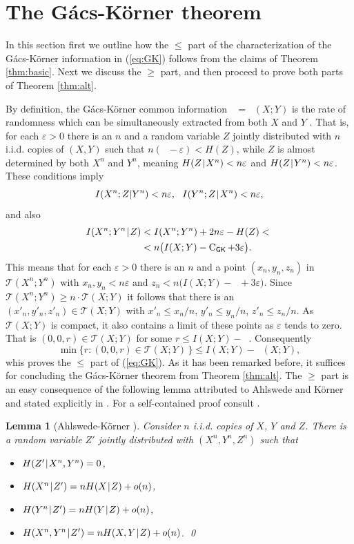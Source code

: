 \documentclass{IEEEtran}
\newtheorem{lemma}[theorem]{Lemma}
\newcommand\eps{\varepsilon}
\newcommand\T{\mathcal{T}}
\DeclareMathOperator\GK{C_{\mathsf{GK}}}
\newcommand\I{I\xspace}
\renewcommand\H{H\xspace}
\def\|{\mkern 1.4mu\mathord{|}\mkern 1.4mu}
\renewcommand{\ge}{\geqslant}
\renewcommand{\le}{\leqslant}
\begin{document}
\def\[{[\mskip -2mu[} \def\]{]\mskip -2mu]}
\def\cd{{\cdot}}

\section{The G\'acs-K\"orner theorem}\label{sec:MMRV}

In this section first we outline how the $\le$ part of the characterization
of the G\'acs-K\"orner information in (\ref{eq:GK}) follows from the claims
of Theorem \ref{thm:basic}. Next we discuss the $\ge$ part, and then proceed
to prove both parts of Theorem \ref{thm:alt}.

By definition, the G\'acs-K\"orner common information $\GK=\GK(X;Y)$ is the
rate of randomness which can be simultaneously extracted from both $X$ and
$Y$ \cite{gacs-korner}. That is, for each $\eps>0$ there is an $n$ and a random variable
$Z$ jointly distributed with $n$ {i.i.d.} copies of $(X,Y)$ such that
$n(\GK-\eps) < H(Z)$, while $Z$ is almost determined by both $X^n$ and
$Y^n$, meaning $\H(Z\|X^n)<n\eps$ and $\H(Z\|Y^n)<n\eps$. These conditions
imply
$$
   \I(X^n;Z|Y^n)<n\eps, ~~ \I(Y^n;Z\|X^n)<n\eps,
$$
and also
\begin{align*}
   \I(X^n;Y^n\|Z) &< \I(X^n;Y^n)+2n\eps -H(Z) <{}\\
                  &< n\big( \I(X;Y)-\GK +3\eps \big).
\end{align*}
This means that for each $\eps>0$ there is an $n$ and a point
$(x_n,y_n,z_n)$ in $\T(X^n;Y^n)$ with $x_n,y_n<n\eps$ and $z_n<
n\big(\I(X;Y)-\GK+3\eps\big)$. Since $\T(X^n;Y^n)\ge n\cdot\T(X;Y)$ it follows
that there is an $(x'_n,y'_n,z'_n) \in \T(X;Y)$ with $x'_n\le x_n/n$,
$y'_n\le y_n/n$, $z'_n\le z_n/n$. As $\T(X;Y)$ is compact,
it also contains a limit of these points as $\eps$ tends to zero.
That is $(0,0,r)\in\T(X;Y)$ for some $r\le \I(X;Y)-\GK$. Consequently
$$
   \min\{r: (0,0,r)\in\T(X;Y)\,\} \le \I(X;Y)-\GK(X;Y),
$$
whis proves the $\le$ part of (\ref{eq:GK}). As it has been remarked before,
it suffices for concluding the G\'acs-K\"orner theorem from Theorem
\ref{thm:alt}. The $\ge$ part is an easy consequence of the following lemma
attributed to Ahlswede and K\"orner and stated explicitly in \cite{tarik}.
For a self-contained proof consult \cite{MMRV}.

\begin{lemma}[Ahlswede-K\"orner \cite{AGK,CsK81}]
Consider $n$ {i.i.d.} copies of $X$, $Y$ and $Z$. There is a random variable $Z'$ 
jointly distributed with $(X^n,Y^n,Z^n)$ such that
\begin{itemize}
\item $\H(Z' \| X^n,Y^n)=0$,
\item $\H(X^n\|Z') = n\H(X\|Z)+o(n)$,
\item $\H(Y^n\|Z') = n\H(Y\|Z)+o(n)$,
\item $\H(X^n,Y^n\|Z') = n\H(X,Y\|Z)+o(n)$. \qed
\end{itemize}
\end{lemma}
\end{document}
